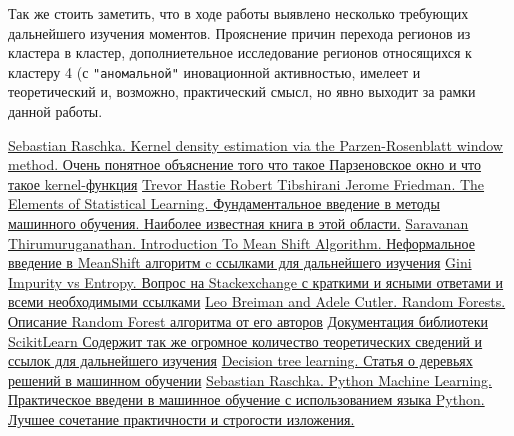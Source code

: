 \documentclass[11pt]{article}
\begin{document}
Так же стоить заметить, что в ходе работы выявлено несколько требующих
дальнейшего изучения моментов. Прояснение причин перехода регионов из
кластера в кластер, дополниетельное исследование регионов относящихся к
кластеру 4 (с \verb'"аномальной"' иновационной активностью, имелеет и
теоретический и, возможно, практический смысл, но явно выходит за рамки
данной работы.


\begin{thebibliography}{}
     \href{http://sebastianraschka.com/Articles/2014_kernel_density_est.html}{ Sebastian Raschka. Kernel density estimation via the Parzen-Rosenblatt window method. Очень понятное объяснение того что такое Парзеновское окно и что такое kernel-функция}
     \href{https://web.stanford.edu/~hastie/ElemStatLearn/} {Trevor Hastie Robert Tibshirani Jerome Friedman. The Elements of Statistical Learning.  Фундаментальное введение в методы машинного обучения. Наиболее известная книга в этой области.}
     \href{https://saravananthirumuruganathan.wordpress.com/about/} { Saravanan Thirumuruganathan. Introduction To Mean Shift Algorithm. Неформальное введение в MeanShift алгоритм c ссылками для дальнейшего изучения}
     \href{https://datascience.stackexchange.com/questions/10228/gini-impurity-vs-entropy} {Gini Impurity vs Entropy. Вопрос на Stackexchange с краткими и ясными ответами и всеми необходимыми ссылками}
     \href{https://www.stat.berkeley.edu/~breiman/RandomForests/cc_home.htm} {Leo Breiman and Adele Cutler. Random Forests. Описание Random Forest алгоритма от его авторов}
     \href{http://scikit-learn.org/stable/documentation.html} {Документация библиотеки ScikitLearn Содержит так же огромное количество теоретических сведений и ссылок для дальнейшего изучения}
     \href{https://en.wikipedia.org/wiki/Decision_tree_learning} {Decision tree learning. Статья о деревьях решений в машинном обучении}
     \href{https://www.amazon.com/Python-Machine-Learning-Sebastian-Raschka/dp/1783555130} {  Sebastian Raschka. Python Machine Learning. Практическое введени в машинное обучение с использованием языка Python. Лучшее сочетание практичности и строгости изложения.}
\end{thebibliography}


    
    
    
    
\end{document}

